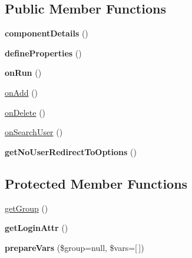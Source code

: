 \subsection*{Public Member Functions}
\begin{DoxyCompactItemize}
\item 
\hypertarget{classDMA_1_1Friends_1_1Components_1_1GroupFormCreation_aff169c7950266d239c20fb1c42cbd95a}{{\bfseries component\-Details} ()}\label{classDMA_1_1Friends_1_1Components_1_1GroupFormCreation_aff169c7950266d239c20fb1c42cbd95a}

\item 
\hypertarget{classDMA_1_1Friends_1_1Components_1_1GroupFormCreation_a9cac8a6091971e1e88d5ca104986cc31}{{\bfseries define\-Properties} ()}\label{classDMA_1_1Friends_1_1Components_1_1GroupFormCreation_a9cac8a6091971e1e88d5ca104986cc31}

\item 
\hypertarget{classDMA_1_1Friends_1_1Components_1_1GroupFormCreation_a0bee9cf0dc3a8923818d402fa3532477}{{\bfseries on\-Run} ()}\label{classDMA_1_1Friends_1_1Components_1_1GroupFormCreation_a0bee9cf0dc3a8923818d402fa3532477}

\item 
\hyperlink{classDMA_1_1Friends_1_1Components_1_1GroupFormCreation_a9dd18b90b440803a9026ac790275f804}{on\-Add} ()
\item 
\hyperlink{classDMA_1_1Friends_1_1Components_1_1GroupFormCreation_a7f4ddea881f2d0205ec7837c698e9490}{on\-Delete} ()
\item 
\hyperlink{classDMA_1_1Friends_1_1Components_1_1GroupFormCreation_a8cc5c8e020c44811c6ccdd75c7375940}{on\-Search\-User} ()
\item 
\hypertarget{classDMA_1_1Friends_1_1Components_1_1GroupFormCreation_a9c69342fdb9b56087dfd6ab7165e5f74}{{\bfseries get\-No\-User\-Redirect\-To\-Options} ()}\label{classDMA_1_1Friends_1_1Components_1_1GroupFormCreation_a9c69342fdb9b56087dfd6ab7165e5f74}

\end{DoxyCompactItemize}
\subsection*{Protected Member Functions}
\begin{DoxyCompactItemize}
\item 
\hyperlink{classDMA_1_1Friends_1_1Components_1_1GroupFormCreation_afcc25a77b90e60e9f2f4e0deacaa2225}{get\-Group} ()
\item 
\hypertarget{classDMA_1_1Friends_1_1Components_1_1GroupFormCreation_a50c69e38289872cd98ca9a2c56c5dbaa}{{\bfseries get\-Login\-Attr} ()}\label{classDMA_1_1Friends_1_1Components_1_1GroupFormCreation_a50c69e38289872cd98ca9a2c56c5dbaa}

\item 
\hypertarget{classDMA_1_1Friends_1_1Components_1_1GroupFormCreation_a163b4d9b15b9cb6a269bc97e25fe1b0f}{{\bfseries prepare\-Vars} (\$group=null, \$vars=\mbox{[}$\,$\mbox{]})}\label{classDMA_1_1Friends_1_1Components_1_1GroupFormCreation_a163b4d9b15b9cb6a269bc97e25fe1b0f}

\end{DoxyCompactItemize}


